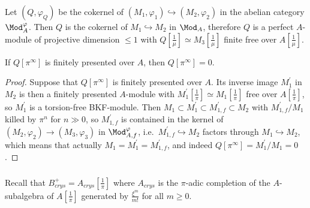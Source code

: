 Let $(Q,\varphi_{Q})$ be the cokernel of $(M_{1},\varphi_{1})\hookrightarrow(M_{2},\varphi_{2})$ in the abelian category $\Mod_{A}^{\varphi}$. Then $Q$ is the cokernel of $M_{1}\hookrightarrow M_{2}$ in $\Mod_{A}$, therefore $Q$ is a perfect $A$-module of projective dimension $\leq1$ with $Q[\frac{1}{\mu}]\simeq M_{3}[\frac{1}{\mu}]$ finite free over $A[\frac{1}{\mu}]$.

\begin{lemm}
If $Q[\pi^{\infty}]$ is finitely presented over $A$, then $Q[\pi^{\infty}]=0$.
\end{lemm}

\begin{proof}
Suppose that $Q[\pi^{\infty}]$ is finitely presented over $A$. Its inverse image $M_{1}^{\prime}$ in $M_{2}$ is then a finitely presented $A$-module with $M_{1}^{\prime}[\frac{1}{\pi}]\simeq M_{1}[\frac{1}{\pi}]$ free over $A[\frac{1}{\pi}]$, so $M_{1}^{\prime}$ is a torsion-free BKF-module. Then $M_{1}\subset M_{1}^{\prime}\subset M_{1,f}^{\prime}\subset M_{2}$ with $M_{1,f}^{\prime}/M_{1}$ killed by $\pi^{n}$ for $n\gg0$, so $M_{1,f}^{\prime}$ is contained in the kernel of $(M_{2},\varphi_{2})\rightarrow(M_{3},\varphi_{3})$ in $\Mod_{A,f}^{\varphi}$, i.e.~$M_{1,f}^{\prime}\hookrightarrow M_{2}$ factors through $M_{1}\hookrightarrow M_{2}$, which means that actually $M_{1}=M_{1}^{\prime}=M_{1,f}^{\prime}$, and indeed $Q[\pi^{\infty}]=M_{1}^{\prime}/M_{1}=0$.
\end{proof}

\subsubsection{}

Recall that $B_{crys}^{+}=A_{crys}[\frac{1}{\pi}]$ where $A_{crys}$ is the $\pi$-adic completion of the $A$-subalgebra of $A[\frac{1}{\pi}]$ generated by $\frac{\xi^{m}}{m!}$ for all $m\geq0$.

